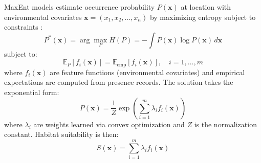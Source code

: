 \documentclass[11pt,a4paper]{article}
\begin{document}
MaxEnt models estimate occurrence probability $P(\mathbf{x})$ at location with environmental covariates $\mathbf{x} = (x_1, x_2, \ldots, x_n)$ by maximizing entropy subject to constraints \cite{phillips2006maximum}:
\begin{equation}
P^*(\mathbf{x}) = \arg\max_{P} H(P) = -\int P(\mathbf{x}) \log P(\mathbf{x}) \, d\mathbf{x}
\end{equation}
subject to:
\begin{equation}
\mathbb{E}_P[f_i(\mathbf{x})] = \mathbb{E}_{\text{emp}}[f_i(\mathbf{x})], \quad i = 1, \ldots, m
\end{equation}
where $f_i(\mathbf{x})$ are feature functions (environmental covariates) and empirical expectations are computed from presence records. The solution takes the exponential form:
\begin{equation}
P(\mathbf{x}) = \frac{1}{Z} \exp\left(\sum_{i=1}^{m} \lambda_i f_i(\mathbf{x})\right)
\end{equation}
where $\lambda_i$ are weights learned via convex optimization and $Z$ is the normalization constant. Habitat suitability is then:
\begin{equation}
S(\mathbf{x}) = \sum_{i=1}^{m} \lambda_i f_i(\mathbf{x})
\end{equation}
\end{document}
